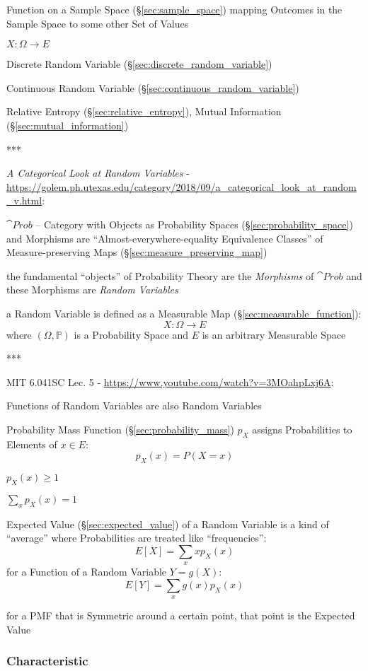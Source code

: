 Function on a Sample Space (\S\ref{sec:sample_space}) mapping Outcomes in the
Sample Space to some other Set of Values

$X : \Omega \rightarrow E$

Discrete Random Variable (\S\ref{sec:discrete_random_variable})

Continuous Random Variable (\S\ref{sec:continuous_random_variable})

\fist Relative Entropy (\S\ref{sec:relative_entropy}), Mutual Information
(\S\ref{sec:mutual_information})

***

\emph{A Categorical Look at Random Variables} -
\url{https://golem.ph.utexas.edu/category/2018/09/a_categorical_look_at_random_v.html}:

$\cat{Prob}$ -- Category with Objects as Probability Spaces
(\S\ref{sec:probability_space}) and Morphisms are ``Almost-everywhere-equality
Equivalence Classes'' of Measure-preserving Maps
(\S\ref{sec:measure_preserving_map})

the fundamental ``objects'' of Probability Theory are the \emph{Morphisms} of
$\cat{Prob}$ and these Morphisms are \emph{Random Variables}

a Random Variable is defined as a Measurable Map
(\S\ref{sec:measurable_function}):
\[
  X : \Omega \rightarrow E
\]
where $(\Omega,\mathbb{P})$ is a Probability Space and $E$ is an arbitrary
Measurable Space

***

MIT 6.041SC Lec. 5 - \url{https://www.youtube.com/watch?v=3MOahpLxj6A}:

Functions of Random Variables are also Random Variables

Probability Mass Function (\S\ref{sec:probability_mass}) $p_X$ assigns
Probabilities to Elements of $x \in E$:
\[
  p_X(x) = P(X = x)
\]

$p_X(x) \geq 1$

$\sum_x p_X(x) = 1$

Expected Value (\S\ref{sec:expected_value}) of a Random Variable is a kind of
``average'' where Probabilities are treated like ``frequencies'':
\[
  E[X] = \sum_x xp_X(x)
\]
for a Function of a Random Variable $Y = g(X)$:
\[
  E[Y] = \sum_x g(x)p_X(x)
\]

for a PMF that is Symmetric around a certain point, that point is the Expected
Value




\subsubsection{Characteristic}\label{sec:characteristic}

